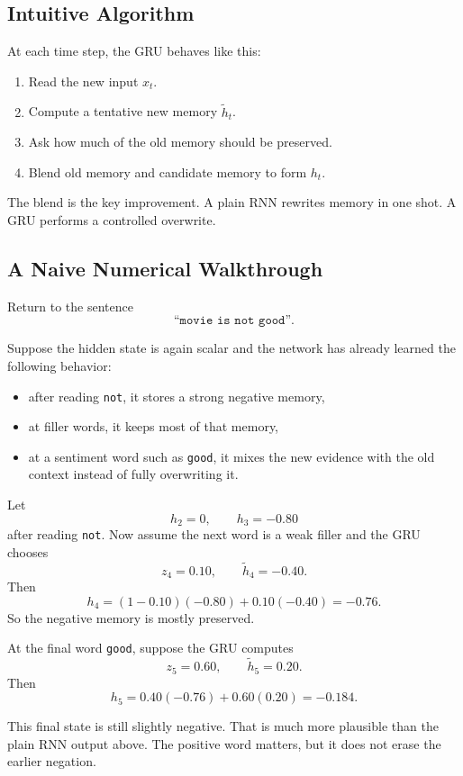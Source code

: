 \documentclass[12pt,a4paper]{article}
\begin{document}
\subsection{Intuitive Algorithm}

At each time step, the GRU behaves like this:

\begin{enumerate}
  \item Read the new input \(x_t\).
  \item Compute a tentative new memory \(\tilde{h}_t\).
  \item Ask how much of the old memory should be preserved.
  \item Blend old memory and candidate memory to form \(h_t\).
\end{enumerate}

The blend is the key improvement. A plain RNN rewrites memory in one shot. A GRU performs a controlled overwrite.

\subsection{A Naive Numerical Walkthrough}

Return to the sentence
\[
\texttt{``movie is not good''}.
\]

Suppose the hidden state is again scalar and the network has already learned the following behavior:
\begin{itemize}
  \item after reading \texttt{not}, it stores a strong negative memory,
  \item at filler words, it keeps most of that memory,
  \item at a sentiment word such as \texttt{good}, it mixes the new evidence with the old context instead of fully overwriting it.
\end{itemize}

Let
\[
h_2 = 0,\qquad
h_3 = -0.80
\]
after reading \texttt{not}. Now assume the next word is a weak filler and the GRU chooses
\[
z_4 = 0.10,\qquad
\tilde{h}_4 = -0.40.
\]
Then
\[
h_4 = (1-0.10)(-0.80) + 0.10(-0.40) = -0.76.
\]
So the negative memory is mostly preserved.

At the final word \texttt{good}, suppose the GRU computes
\[
z_5 = 0.60,\qquad
\tilde{h}_5 = 0.20.
\]
Then
\[
h_5 = 0.40(-0.76) + 0.60(0.20) = -0.184.
\]

This final state is still slightly negative. That is much more plausible than the plain RNN output above. The positive word matters, but it does not erase the earlier negation.
\end{document}
